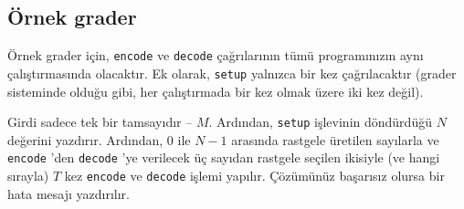 \documentclass[12pt]{article}
\begin{document}
\subsection{Örnek grader}

Örnek grader için, \texttt{encode} ve \texttt{decode} çağrılarının tümü programınızın aynı çalıştırmasında olacaktır. Ek olarak, \texttt{setup} yalnızca bir kez çağrılacaktır (grader sisteminde olduğu gibi, her çalıştırmada bir kez olmak üzere iki kez değil).

Girdi sadece tek bir tamsayıdır -- $M$. Ardından, \texttt{setup} işlevinin döndürdüğü $N$ değerini yazdırır. Ardından, $0$ ile $N-1$ arasında rastgele üretilen sayılarla ve \texttt{encode} 'den \texttt{decode} 'ye verilecek üç sayıdan rastgele seçilen ikisiyle (ve hangi sırayla) $T$ kez \texttt{encode} ve \texttt{decode} işlemi yapılır. Çözümünüz başarısız olursa bir hata mesajı yazdırılır.
\end{document}
